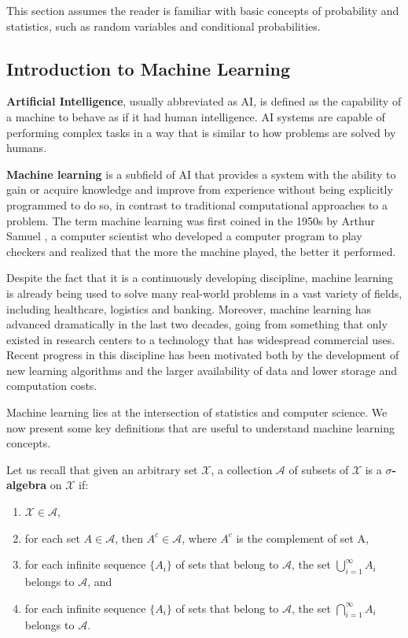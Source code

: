 \documentclass[11pt]{article}
\theoremstyle{definition}
\begin{document}
This section assumes the reader is familiar with basic concepts of probability and statistics, such as random variables and conditional probabilities.

\subsection{Introduction to Machine Learning}

\textbf{Artificial Intelligence}, usually abbreviated as AI, is defined as the capability of a machine to behave as if it had human intelligence. AI systems are capable of performing complex tasks in a way that is similar to how problems are solved by humans.

\textbf{Machine learning} is a subfield of AI that provides a system with the ability to gain or acquire knowledge and improve from experience without being explicitly programmed to do so, in contrast to traditional computational approaches to a problem. The term machine learning was first coined in the 1950s by Arthur Samuel \cite{Samuel}, a computer scientist who developed a computer program to play checkers and realized that the more the machine played, the better it performed. 

Despite the fact that it is a continuously developing discipline, machine learning is already being used to solve many real-world problems in a vast variety of fields, including healthcare, logistics and banking. Moreover, machine learning has advanced dramatically in the last two decades, going from something that only existed in research centers to a technology that has widespread commercial uses. Recent progress in this discipline has been motivated both by the development of new learning algorithms and the larger availability of data and lower storage and computation costs.

Machine learning lies at the intersection of statistics and computer science. We now present some key definitions that are useful to understand machine learning concepts.

Let us recall that given an arbitrary set $\mathcal{X}$, a collection $\mathcal{A}$ of subsets of $\mathcal{X}$ is a \textbf{$\sigma$-algebra} on $\mathcal{X}$ if: 
\begin{enumerate}[label=\roman*.]
    \item $\mathcal{X} \in \mathcal{A}$,
    \item for each set $A \in \mathcal{A}$, then $A^c \in \mathcal{A}$, where $A^c$ is the complement of set A,
    \item for each infinite sequence $\{A_i\}$ of sets that belong to $\mathcal{A}$, the set $\bigcup^{\infty}_{i=1}A_i$ belongs to $\mathcal{A}$, and
    \item for each infinite sequence $\{A_i\}$ of sets that belong to $\mathcal{A}$, the set $\bigcap^{\infty}_{i=1}A_i$ belongs to $\mathcal{A}$.
\end{enumerate}
\end{document}
